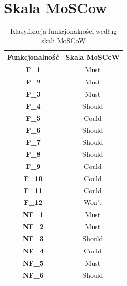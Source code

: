 \documentclass[12pt,titlepage]{article}
\begin{document}
    


\newpage
\section{Skala MoSCow}
    
\begin{table}[ht]
    \centering
    \renewcommand{\arraystretch}{1.3} 
    \begin{tabular}{|c|c|}
        \hline
        \textbf{Funkcjonalność} & \textbf{Skala MoSCoW} \\ \hline
        \textbf{F\_1}           & Must                  \\ \hline
        \textbf{F\_2}           & Must                  \\ \hline
        \textbf{F\_3}           & Must                  \\ \hline
        \textbf{F\_4}           & Should                \\ \hline
        \textbf{F\_5}           & Could                 \\ \hline
        \textbf{F\_6}           & Should                \\ \hline
        \textbf{F\_7}           & Should                \\ \hline
        \textbf{F\_8}           & Should                \\ \hline
        \textbf{F\_9}           & Could                 \\ \hline
        \textbf{F\_10}          & Could                 \\ \hline
        \textbf{F\_11}          & Could                 \\ \hline
        \textbf{F\_12}          & Won't                 \\ \hline
        \textbf{NF\_1}          & Must                  \\ \hline
        \textbf{NF\_2}          & Must                  \\ \hline
        \textbf{NF\_3}          & Should                \\ \hline
        \textbf{NF\_4}          & Could                 \\ \hline
        \textbf{NF\_5}          & Must                \\ \hline
        \textbf{NF\_6}          & Should                 \\ \hline
    \end{tabular}
    \caption{Klasyfikacja funkcjonalności według skali MoSCoW}
    \label{tab:moscow-classification}
\end{table}
\end{document}
